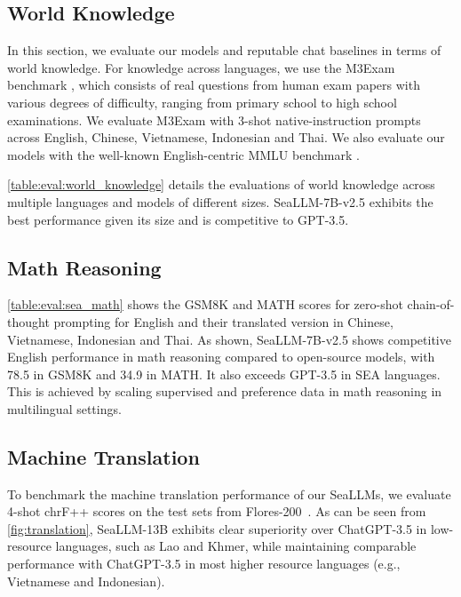 \subsection{World Knowledge}\label{sec:eval:knowledge}

In this section, we evaluate our models and reputable chat baselines \citep{llama2touvron2023llama,polylm_wei2023polylm,chatgpt} in terms of world knowledge. For knowledge across languages, we use the M3Exam benchmark \citep{m3exam}, which consists of real questions from human exam papers with various degrees of difficulty, ranging from primary school to high school examinations. We evaluate M3Exam with 3-shot native-instruction prompts across English, Chinese, Vietnamese, Indonesian and Thai. We also evaluate our models with the well-known English-centric MMLU benchmark \citep{mmlu_hendryckstest2021}.

\ref{table:eval:world_knowledge} details the evaluations of world knowledge across multiple languages and models of different sizes. SeaLLM-7B-v2.5 exhibits the best performance given its size and is competitive to GPT-3.5.

\subsection{Math Reasoning}\label{sec:eval:math_reasoning}

\ref{table:eval:sea_math} shows the GSM8K and MATH scores \citep{gsm8k_cobbe2021gsm8k,MATH_hendrycksmath2021} for zero-shot chain-of-thought prompting for English and their translated version in Chinese, Vietnamese, Indonesian and Thai. As shown, SeaLLM-7B-v2.5 shows competitive English performance in math reasoning compared to open-source models, with 78.5 in GSM8K and 34.9 in MATH. It also exceeds GPT-3.5 in SEA languages. This is achieved by scaling supervised and preference data in math reasoning in multilingual settings.

\subsection{Machine Translation}\label{sec:eval:translation}
To benchmark the machine translation performance of our SeaLLMs, we evaluate 4-shot chrF++ scores on the test sets from Flores-200~\cite{nllb_costa2022no_flores200}. As can be seen from \ref{fig:translation}, SeaLLM-13B exhibits clear superiority over ChatGPT-3.5 in low-resource languages, such as Lao and Khmer, while maintaining comparable performance with ChatGPT-3.5 in most higher resource languages (e.g., Vietnamese and Indonesian). 

